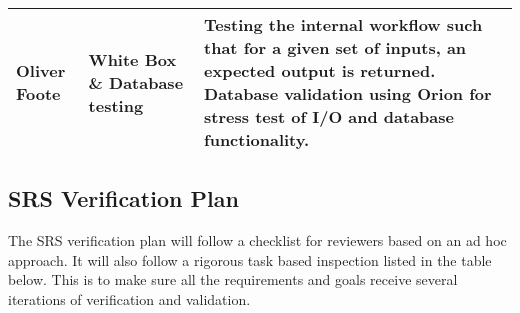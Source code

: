 \documentclass[12pt, titlepage]{article}
\begin{document}
\begin{center}
\begin{tabular}{|m{5em}|m{5em}|m{25em}|}
    \hline
    Oliver Foote             & White Box \& Database testing & Testing the internal workflow such that for a given set of inputs, an expected output is returned. Database validation using Orion for stress test of I/O and database functionality.                                                                               \\
    \hline
  \end{tabular}
\end{center}

\subsection{SRS Verification Plan}\label{SRS_verification}

The SRS verification plan will follow a checklist for reviewers based on an ad hoc approach. It will also follow a rigorous task based inspection listed in the table below. This is to make sure all the requirements and goals receive several iterations of verification and validation.
\end{document}
